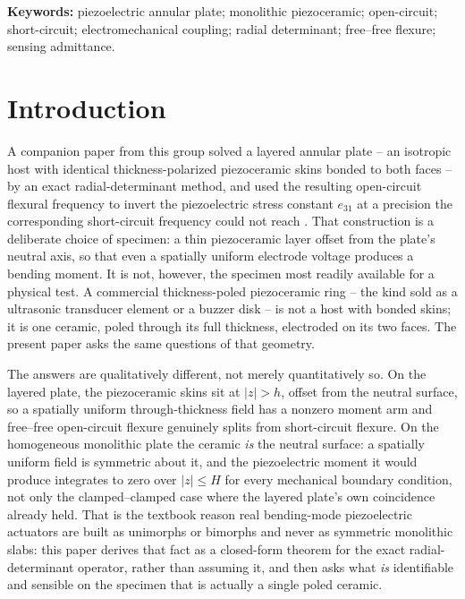 \documentclass[11pt]{article}
\begin{document}
\noindent\textbf{Keywords:} piezoelectric annular plate; monolithic
piezoceramic; open-circuit; short-circuit; electromechanical coupling;
radial determinant; free--free flexure; sensing admittance.

\section{Introduction}\label{sec:intro}
A companion paper from this group solved a layered annular plate --
an isotropic host with identical thickness-polarized piezoceramic skins
bonded to both faces -- by an exact radial-determinant method, and used
the resulting open-circuit flexural frequency to invert the piezoelectric
stress constant $e_{31}$ at a precision the corresponding short-circuit
frequency could not reach \cite{mccune2026piezo}. That construction is a
deliberate choice of specimen: a thin piezoceramic layer offset from the
plate's neutral axis, so that even a spatially uniform electrode voltage
produces a bending moment. It is not, however, the specimen most readily
available for a physical test. A commercial thickness-poled piezoceramic
ring -- the kind sold as a ultrasonic transducer element or a buzzer disk
-- is not a host with bonded skins; it is one ceramic, poled through its
full thickness, electroded on its two faces. The present paper asks the
same questions of that geometry.

The answers are qualitatively different, not merely quantitatively so.
On the layered plate, the piezoceramic skins sit at $\lvert z\rvert>h$,
offset from the neutral surface, so a spatially uniform through-thickness
field has a nonzero moment arm and free--free open-circuit flexure
genuinely splits from short-circuit flexure. On the homogeneous
monolithic plate the ceramic \emph{is} the neutral surface: a spatially
uniform field is symmetric about it, and the piezoelectric moment it
would produce integrates to zero over $\lvert z\rvert\le H$ for every
mechanical boundary condition, not only the clamped--clamped case where
the layered plate's own coincidence already held. That is the textbook
reason real bending-mode piezoelectric actuators are built as unimorphs
or bimorphs and never as symmetric monolithic slabs: this paper derives
that fact as a closed-form theorem for the exact radial-determinant
operator, rather than assuming it, and then asks what \emph{is}
identifiable and sensible on the specimen that is actually a single
poled ceramic.
\end{document}
